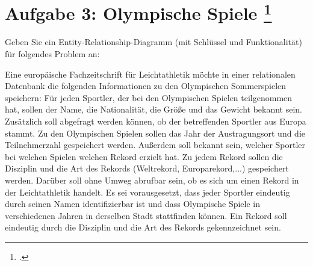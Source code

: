\documentclass{lehramt-informatik-aufgabe}
\begin{document}

\section{Aufgabe 3: Olympische Spiele
\footcite{db:ab:4}}

Geben Sie ein Entity-Relationship-Diagramm (mit Schlüssel und
Funktionalität) für folgendes Problem an:

Eine europäische Fachzeitschrift für Leichtathletik möchte in einer
relationalen Datenbank die folgenden Informationen zu den Olympischen
Sommerspielen speichern: Für jeden Sportler, der bei den Olympischen
Spielen teilgenommen hat, sollen der Name, die Nationalität, die Größe
und das Gewicht bekannt sein. Zusätzlich soll abgefragt werden können,
ob der betreffenden Sportler aus Europa stammt. Zu den Olympischen
Spielen sollen das Jahr der Austragungsort und die Teilnehmerzahl
gespeichert werden. Außerdem soll bekannt sein, welcher Sportler bei
welchen Spielen welchen Rekord erzielt hat. Zu jedem Rekord sollen die
Disziplin und die Art des Rekords (Weltrekord, Europarekord,...)
gespeichert werden. Darüber soll ohne Umweg abrufbar sein, ob es sich um
einen Rekord in der Leichtathletik handelt. Es sei vorausgesetzt, dass
jeder Sportler eindeutig durch seinen Namen identifizierbar ist und dass
Olympische Spiele in verschiedenen Jahren in derselben Stadt stattfinden
können. Ein Rekord soll eindeutig durch die Disziplin und die Art des
Rekords gekennzeichnet sein.
\end{document}
